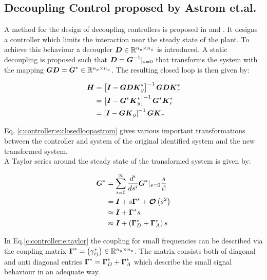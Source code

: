 \subsection{Decoupling Control proposed by Astrom et.al.}
\label{c:controller:sub:astrom}
A method for the design of decoupling controllers is proposed in \cite{Astrom2001a} and \cite{Astrom2006}. It designs a controller which limits the interaction near the steady state of the plant. To achieve this behaviour a decoupler $\mbox{\boldmath$D$} \in  \mathbb{R}^{n_y \times n_y}$ is introduced. A static decoupling is proposed such that $\mbox{\boldmath$D$} = \mbox{\boldmath$G$}^{-1}|_{s=0}$ that transforms the system with the mapping $\mbox{\boldmath$G$} \mbox{\boldmath$D$} = \mbox{\boldmath$G$}^* \in \mathbb{R}^{n_y \times n_y}$. The resulting closed loop is then given by: 

\begin{align}
\begin{split}
\mbox{\boldmath$H$} &= \left[ \mbox{\boldmath$I$}  - \mbox{\boldmath$G$} \mbox{\boldmath$D$} \mbox{\boldmath$K$}_y^* \right]^{-1} \mbox{\boldmath$G$} \mbox{\boldmath$D$} \mbox{\boldmath$K$}_r^* \\
	 &= \left[ \mbox{\boldmath$I$}  - \mbox{\boldmath$G$}^* \mbox{\boldmath$K$}_y^* \right]^{-1} \mbox{\boldmath$G$}^* \mbox{\boldmath$K$}_r^* \\
     &= \left[ \mbox{\boldmath$I$}  - \mbox{\boldmath$G$} \mbox{\boldmath$K$}_y \right]^{-1} \mbox{\boldmath$G$} \mbox{\boldmath$K$}_r \\
\end{split}
\label{c:controller:e:closedloopastrom}
\end{align}

Eq. \ref{c:controller:e:closedloopastrom} gives various important transformations between the controller and system of the original identified system and the new transformed system. \\ 

A Taylor series around the steady state of the  transformed system is given by:

\begin{align}
\begin{split}
\mbox{\boldmath$G$}^* &= \sum_{i=0}^\infty \frac{d^i}{ds^i} \mbox{\boldmath$G$}^* |_{s=0} \frac{s}{i!} \\
&= \mbox{\boldmath$I$} + s \mbox{\boldmath$\Gamma$}^* + \mbox{\boldmath$\mathcal{O}$}\left(s^2\right) \\
&\approx \mbox{\boldmath$I$} +  \mbox{\boldmath$\Gamma$}^* s \\
&\approx \mbox{\boldmath$I$} + \left( \mbox{\boldmath$\Gamma$}^*_D + \mbox{\boldmath$\Gamma$}^*_A \right) s
\end{split}
\label{c:controller:e:taylor}
\end{align}

In Eq.\ref{c:controller:e:taylor} the coupling for small frequencies can be described via the coupling matrix $\mbox{\boldmath$\Gamma$}^* = \left( \gamma_{ij}^* \right)\in \mathbb{R}^{n_y \times n_y}$. The matrix consists both of diagonal and anti diagonal entries $\mbox{\boldmath$\Gamma$}^* = \mbox{\boldmath$\Gamma$}^*_D + \mbox{\boldmath$\Gamma$}^*_A$ which describe the small signal behaviour in an adequate way.\\

